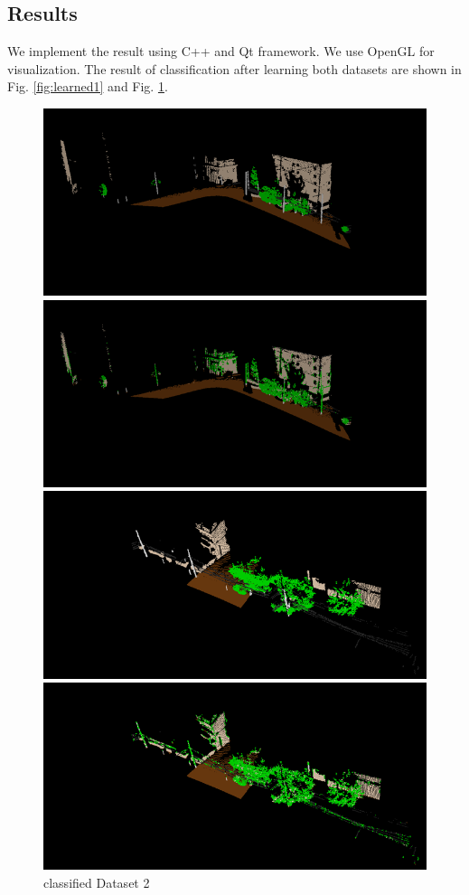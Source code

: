 \documentclass[letterpaper]{article}
\begin{document}
\subsection{Results}
We implement the result using C++ and Qt framework. We use OpenGL for visualization. The result of classification after learning both datasets are shown in Fig. \ref{fig:learned1} and Fig. \ref{fig:learned2}.
\begin{figure}
  \centering
  \includegraphics[scale = 0.4]{raw1}
\caption{given Dataset 1}
\includegraphics[scale = 0.4]{learned1}
\caption{classified Dataset 1}
\label{fig:learned1}
  \includegraphics[scale = 0.4]{raw2}
\caption{given Dataset 2}
\includegraphics[scale = 0.4]{learned2}
\caption{classified Dataset 2}
\label{fig:learned2}
\end{figure}
\end{document}
